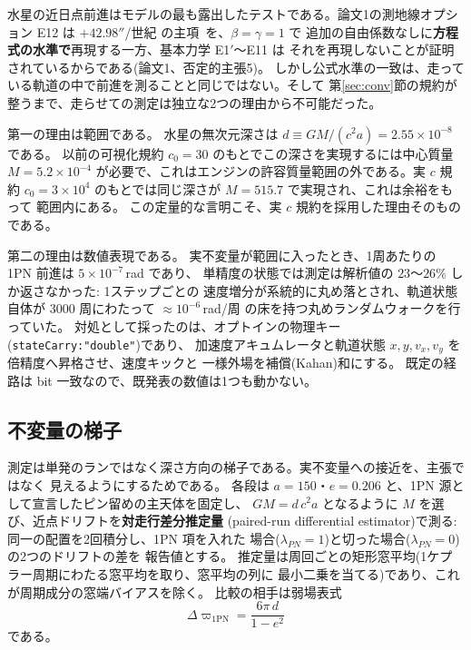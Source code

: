 \documentclass[a4paper,10pt,twocolumn]{ltjsarticle}
\begin{document}
水星の近日点前進はモデルの最も露出したテストである。論文1の測地線オプション E12 は
$+42.98''$/世紀 の主項~\cite{Clemence1947,Park2017,Will2014}を、$\beta=\gamma=1$ で
追加の自由係数なしに\textbf{方程式の水準で}再現する一方、基本力学 E1$'$〜E11 は
それを再現しないことが証明されているからである(論文1、否定的主張5)。
しかし公式水準の一致は、走っている軌道の中で前進を測ることと同じではない。そして
第\ref{sec:conv}節の規約が整うまで、走らせての測定は独立な2つの理由から不可能だった。

第一の理由は範囲である。
水星の無次元深さは $d\equiv GM/(c^{2}a)=2.55\times10^{-8}$ である。
以前の可視化規約 $c_0=30$ のもとでこの深さを実現するには中心質量
$M=5.2\times10^{-4}$ が必要で、これはエンジンの許容質量範囲の外である。実 $c$ 規約
$c_0=3\times10^{4}$ のもとでは同じ深さが $M=515.7$ で実現され、これは余裕をもって
範囲内にある。
この定量的な言明こそ、実 $c$ 規約を採用した理由そのものである。

第二の理由は数値表現である。
実不変量が範囲に入ったとき、1周あたりの 1PN 前進は $5\times10^{-7}$\,rad であり、
単精度の状態では測定は解析値の $23$〜$26\%$ しか返さなかった: 1ステップごとの
速度増分が系統的に丸め落とされ、軌道状態自体が $3000$ 周にわたって
$\approx10^{-6}$\,rad/周 の床を持つ丸めランダムウォークを行っていた。
対処として採ったのは、オプトインの物理キー(\texttt{stateCarry:"double"})であり、
加速度アキュムレータと軌道状態 $x,y,v_x,v_y$ を倍精度へ昇格させ、速度キックと
一様外場を補償(Kahan)和にする。
既定の経路は bit 一致なので、既発表の数値は1つも動かない。

\subsection{不変量の梯子}
\label{sec:p1ladder}

測定は単発のランではなく深さ方向の梯子である。実不変量への接近を、主張ではなく
見えるようにするためである。
各段は $a=150$・$e=0.206$ と、1PN 源として宣言したピン留めの主天体を固定し、
$GM=d\,c^{2}a$ となるように $M$ を選び、近点ドリフトを\textbf{対走行差分推定量}
(paired-run differential estimator)で測る: 同一の配置を2回積分し、1PN 項を入れた
場合($\lambda_{PN}=1$)と切った場合($\lambda_{PN}=0$)の2つのドリフトの差を
報告値とする。
推定量は周回ごとの矩形窓平均(1ケプラー周期にわたる窓平均を取り、窓平均の列に
最小二乗を当てる)であり、これが周期成分の窓端バイアスを除く。
比較の相手は弱場表式
\begin{equation}
  \Delta\varpi_{1\mathrm{PN}} = \frac{6\pi\,d}{1-e^{2}}
  \label{eq:1pn}
\end{equation}
である。
\end{document}
